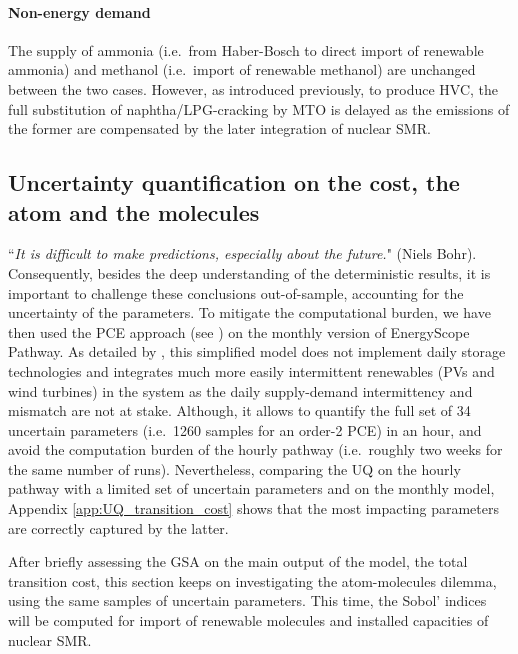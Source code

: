 \documentclass[11pt,twoside,a4paper,english]{article}
\def\ie{i.e.\ }
\begin{document}
\paragraph*{Non-energy demand}
The supply of ammonia (\ie from Haber-Bosch to direct import of renewable ammonia) and methanol (\ie import of renewable methanol) are unchanged between the two cases. However, as introduced previously, to produce \gls{HVC}, the full substitution of naphtha/LPG-cracking by \gls{MTO} is delayed as the emissions of the former are compensated by the later integration of nuclear SMR.

\subsection{Uncertainty quantification on the cost, the atom and the molecules}
\label{subsec:results_uq}
``\textit{It is difficult to make predictions, especially about the future.}" (Niels Bohr). Consequently, besides the deep understanding of the deterministic results, it is important to challenge these conclusions out-of-sample, accounting for the uncertainty of the parameters. To mitigate the computational burden, we have then used the \gls{PCE} approach (see ) on the monthly version of EnergyScope Pathway. As detailed by \citet{limpens2023pathway}, this simplified model does not implement daily storage technologies and integrates much more easily intermittent renewables (PVs and wind turbines) in the system as the daily supply-demand intermittency and mismatch are not at stake. Although, it allows to quantify the full set of 34 uncertain parameters (\ie 1260 samples for an order-2 \gls{PCE}) in an hour, and avoid the computation burden of the hourly pathway (\ie roughly two weeks for the same number of runs). Nevertheless, comparing the \gls{UQ} on the hourly pathway with a limited set of uncertain parameters and on the monthly model, Appendix \ref{app:UQ_transition_cost} shows that the most impacting parameters are correctly captured by the latter.

After briefly assessing the \gls{GSA} on the main output of the model, the total transition cost, this section keeps on investigating the atom-molecules dilemma, using the same samples of uncertain parameters. This time, the Sobol' indices will be computed for import of renewable molecules and installed capacities of nuclear SMR.
\end{document}
